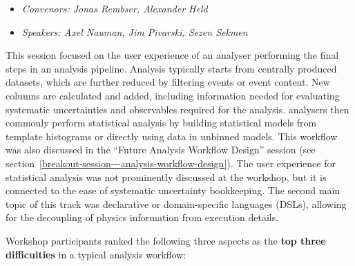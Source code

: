 \documentclass[a4paper,11pt]{article}
\begin{document}
\begin{itemize}
    \item \emph{Convenors: Jonas Rembser, Alexander Held}
    \item \emph{Speakers: Axel Nauman, Jim Pivarski, Sezen Sekmen}
\end{itemize}

This session focused on the user experience of an analyser performing
the final steps in an analysis pipeline. Analysis typically starts from
centrally produced datasets, which are further reduced by filtering
events or event content. New columns are calculated and added, including
information needed for evaluating systematic uncertainties and
observables required for the analysis. analysers then commonly perform
statistical analysis by building statistical models from template
histograms or directly using data in unbinned models. This workflow was
also discussed in the
``Future
Analysis Workflow Design'' session (see section~\ref{breakout-session---analysis-workflow-design}). The user experience for
statistical analysis was not prominently discussed at the workshop, but
it is connected to the ease of systematic uncertainty bookkeeping. The
second main topic of this track was declarative or domain-specific
languages (DSLs), allowing for the decoupling of physics information
from execution details.

Workshop participants ranked the following three aspects as the
\textbf{top three difficulties} in a typical analysis workflow:
\end{document}
